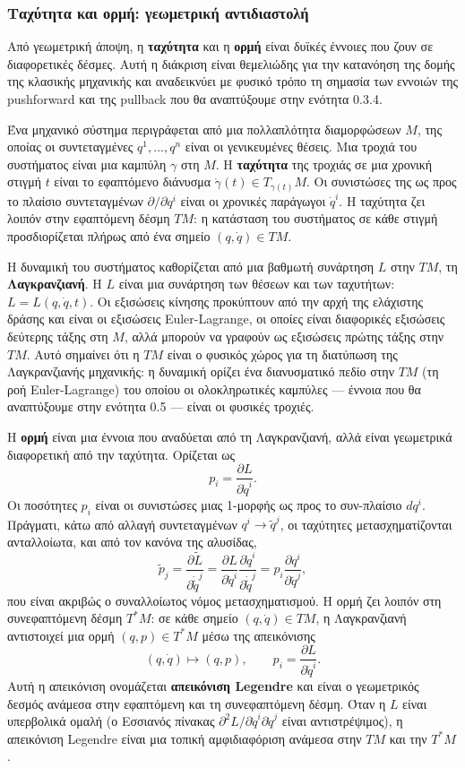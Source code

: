 \documentclass[12pt]{article}
\begin{document}
\subsubsection{Ταχύτητα και ορμή: γεωμετρική αντιδιαστολή}

Από γεωμετρική άποψη, η \textbf{ταχύτητα} και η \textbf{ορμή} είναι δυϊκές έννοιες που ζουν σε διαφορετικές δέσμες. Αυτή η διάκριση είναι θεμελιώδης για την κατανόηση της δομής της κλασικής μηχανικής και αναδεικνύει με φυσικό τρόπο τη σημασία των εννοιών της pushforward και της pullback που θα αναπτύξουμε στην ενότητα 0.3.4.

Ένα μηχανικό σύστημα περιγράφεται από μια πολλαπλότητα διαμορφώσεων $M$, της οποίας οι συντεταγμένες $q^1, \dots, q^n$ είναι οι γενικευμένες θέσεις. Μια τροχιά του συστήματος είναι μια καμπύλη $\gamma$ στη $M$. Η \textbf{ταχύτητα} της τροχιάς σε μια χρονική στιγμή $t$ είναι το εφαπτόμενο διάνυσμα $\dot{\gamma}(t) \in T_{\gamma(t)}M$. Οι συνιστώσες της ως προς το πλαίσιο συντεταγμένων $\partial / \partial q^i$ είναι οι χρονικές παράγωγοι $\dot{q}^i$. Η ταχύτητα ζει λοιπόν στην εφαπτόμενη δέσμη $TM$: η κατάσταση του συστήματος σε κάθε στιγμή προσδιορίζεται πλήρως από ένα σημείο $(q, \dot{q}) \in TM$.

Η δυναμική του συστήματος καθορίζεται από μια βαθμωτή συνάρτηση $L$ στην $TM$, τη \textbf{Λαγκρανζιανή}. Η $L$ είναι μια συνάρτηση των θέσεων και των ταχυτήτων: $L = L(q, \dot{q}, t)$. Οι εξισώσεις κίνησης προκύπτουν από την αρχή της ελάχιστης δράσης και είναι οι εξισώσεις Euler-Lagrange, οι οποίες είναι διαφορικές εξισώσεις δεύτερης τάξης στη $M$, αλλά μπορούν να γραφούν ως εξισώσεις πρώτης τάξης στην $TM$. Αυτό σημαίνει ότι η $TM$ είναι ο φυσικός χώρος για τη διατύπωση της Λαγκρανζιανής μηχανικής: η δυναμική ορίζει ένα διανυσματικό πεδίο στην $TM$ (τη ροή Euler-Lagrange) του οποίου οι ολοκληρωτικές καμπύλες --- έννοια που θα αναπτύξουμε στην ενότητα 0.5 --- είναι οι φυσικές τροχιές.

Η \textbf{ορμή} είναι μια έννοια που αναδύεται από τη Λαγκρανζιανή, αλλά είναι γεωμετρικά διαφορετική από την ταχύτητα. Ορίζεται ως
\[
p_i = \frac{\partial L}{\partial \dot{q}^i}.
\]
Οι ποσότητες $p_i$ είναι οι συνιστώσες μιας 1-μορφής ως προς το συν-πλαίσιο $dq^i$. Πράγματι, κάτω από αλλαγή συντεταγμένων $q^i \to \tilde{q}^j$, οι ταχύτητες μετασχηματίζονται ανταλλοίωτα, και από τον κανόνα της αλυσίδας,
\[
\tilde{p}_j = \frac{\partial \tilde{L}}{\partial \dot{\tilde{q}}^j} = \frac{\partial L}{\partial \dot{q}^i} \frac{\partial \dot{q}^i}{\partial \dot{\tilde{q}}^j} = p_i \frac{\partial q^i}{\partial \tilde{q}^j},
\]
που είναι ακριβώς ο συναλλοίωτος νόμος μετασχηματισμού. Η ορμή ζει λοιπόν στη συνεφαπτόμενη δέσμη $T^*M$: σε κάθε σημείο $(q, \dot{q}) \in TM$, η Λαγκρανζιανή αντιστοιχεί μια ορμή $(q, p) \in T^*M$ μέσω της απεικόνισης
\[
(q, \dot{q}) \mapsto (q, p), \qquad p_i = \frac{\partial L}{\partial \dot{q}^i}.
\]
Αυτή η απεικόνιση ονομάζεται \textbf{απεικόνιση Legendre} και είναι ο γεωμετρικός δεσμός ανάμεσα στην εφαπτόμενη και τη συνεφαπτόμενη δέσμη. Όταν η $L$ είναι υπερβολικά ομαλή (ο Εσσιανός πίνακας $\partial^2 L / \partial \dot{q}^i \partial \dot{q}^j$ είναι αντιστρέψιμος), η απεικόνιση Legendre είναι μια τοπική αμφιδιαφόριση ανάμεσα στην $TM$ και την $T^*M$.
\end{document}
